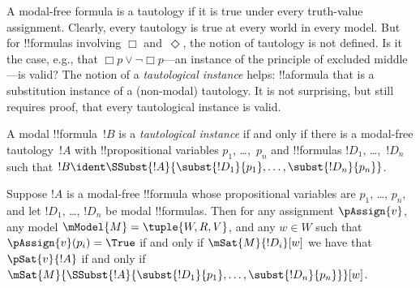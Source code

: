\documentclass[../../../include/open-logic-section]{subfiles}
\begin{document}

\begin{explain}
A modal-free formula is a tautology if it is true under every
truth-value assignment. Clearly, every tautology is true at every
world in every model. But for !!{formula}s involving $\Box$
and~$\Diamond$, the notion of tautology is not defined. Is it the
case, e.g., that $\Box p \lor \lnot \Box p$---an instance of the
principle of excluded middle---is valid? The notion of a
\emph{tautological instance} helps: !!a{formula} that is a
substitution instance of a (non-modal) tautology. It is not
surprising, but still requires proof, that every tautological instance
is valid.
\end{explain}

\begin{defn}
  A modal !!{formula}~$!B$ is a \emph{tautological instance} if and
  only if there is a modal-free tautology~$!A$ with !!{propositional
    variable}s $p_1$, \dots,~$p_n$ and !!{formula}s $!D_1$,
  \dots,~$!D_n$ such that $!B \ident \SSubst{!A}{\subst{!D_1}{p_1},
    \dots, \subst{!D_n}{p_n}}$.
\end{defn}

\begin{lem}
  Suppose $!A$ is a modal-free !!{formula} whose propositional
  variables are $p_1$, \dots, $p_n$, and let $!D_1$, \dots,
  $!D_n$ be modal !!{formula}s. Then for any assignment $\pAssign{v}$,
  any model $\mModel{M} = \tuple{W, R, V}$, and any $w \in W$ such
  that $\pAssign{v}(p_i) = \True$ if and only if $\mSat{M}{!D_i}[w]$ we have
  that $\pSat{v}{!A}$ if and only if
  $\mSat{M}{\SSubst{!A}{\subst{!D_1}{p_1}, \dots,
      \subst{!D_n}{p_n}}}[w]$.
\end{lem}
\end{document}
